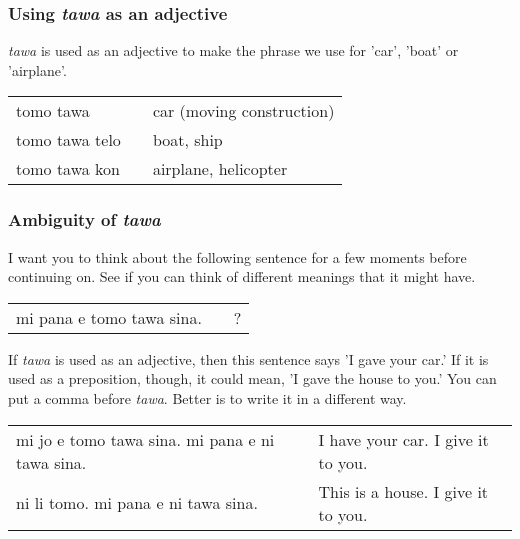 \subsubsection*{Using \textit{tawa} as an adjective}
%
\textit{tawa} is used as an adjective to make the phrase we use for 'car', 'boat' or 'airplane'.

\begin{supertabular}{p{5,5cm}|ll}
tomo tawa && car (moving construction) \\
tomo tawa telo && boat, ship \\
tomo tawa kon && airplane, helicopter \\
\end{supertabular} 
%
\subsubsection*{Ambiguity of \textit{tawa}}
%
I want you to think about the following sentence for a few moments before continuing on. 
See if you can think of different meanings that it might have. 

\begin{supertabular}{p{5,5cm}|ll}
mi pana e tomo tawa sina. && ? \\   %
\end{supertabular} 

If \textit{tawa} is used as an adjective, then this sentence says 'I gave your car.' 
If it is used as a preposition, though, it could mean, 'I gave the house to you.' 
You can put a comma before \textit{tawa}. 
Better is to write it in a different way.

\begin{supertabular}{p{5,5cm}|ll}
mi jo e tomo tawa sina. mi pana e ni tawa sina. && I have your car. I give it to you. \\
ni li tomo. mi pana e ni tawa sina. && This is a house. I give it to you. \\
\end{supertabular} 

%
{}
